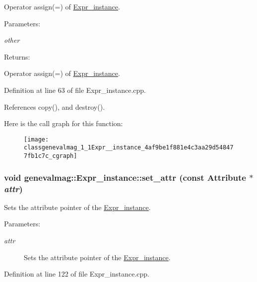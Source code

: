 Operator assign(=) of \hyperlink{classgenevalmag_1_1Expr__instance}{Expr\_\-instance}. \begin{Desc}
\item[Parameters:]
\begin{description}
\item[{\em other}]\end{description}
\end{Desc}
\begin{Desc}
\item[Returns:]\end{Desc}
Operator assign(=) of \hyperlink{classgenevalmag_1_1Expr__instance}{Expr\_\-instance}. 

Definition at line 63 of file Expr\_\-instance.cpp.

References copy(), and destroy().

Here is the call graph for this function:\nopagebreak
\begin{figure}[H]
\begin{center}
\leavevmode
\texttt{[image: classgenevalmag\_1\_1Expr\_\_instance\_4af9be1f881e4c3aa29d548477fb1c7c\_cgraph]}
\end{center}
\end{figure}
\hypertarget{classgenevalmag_1_1Expr__instance_66ddf26666df395c4da1abab5f8d22a9}{
\subsubsection[{set\_\-attr}]{\setlength{\rightskip}{0pt plus 5cm}void genevalmag::Expr\_\-instance::set\_\-attr (const {\bf Attribute} $\ast$ {\em attr})}}
\label{classgenevalmag_1_1Expr__instance_66ddf26666df395c4da1abab5f8d22a9}


Sets the attribute pointer of the \hyperlink{classgenevalmag_1_1Expr__instance}{Expr\_\-instance}. \begin{Desc}
\item[Parameters:]
\begin{description}
\item[{\em attr}]Sets the attribute pointer of the \hyperlink{classgenevalmag_1_1Expr__instance}{Expr\_\-instance}. \end{description}
\end{Desc}


Definition at line 122 of file Expr\_\-instance.cpp.

